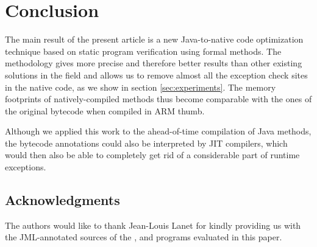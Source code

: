 
\section{Conclusion}
\label{sec:conclusion}
The main result of the present article is a new Java-to-native code optimization technique based on static program verification using formal methods. The methodology gives more precise and therefore better results than other existing solutions in the field and allows us to remove almost all the exception check sites in the native code, as we show in section \ref{sec:experiments}. The memory footprints of natively-compiled methods thus become comparable with the ones of the original bytecode when compiled in ARM thumb.

Although we applied this work to the ahead-of-time compilation of Java methods, the bytecode annotations could also be interpreted by JIT compilers, which would then also be able to completely get rid of a considerable part of runtime exceptions.

\subsection*{Acknowledgments}
The authors would like to thank Jean-Louis Lanet for kindly providing us with the JML-annotated sources of the ,  and  programs evaluated in this paper.
